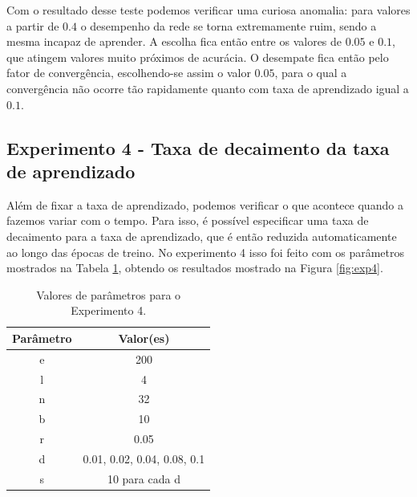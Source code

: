 \documentclass[12pt]{article}
\begin{document}
Com o resultado desse teste podemos verificar uma curiosa anomalia:
para valores a partir de $ 0.4 $ o desempenho da rede se torna 
extremamente ruim, sendo a mesma incapaz de aprender. A escolha fica
então entre os valores de $ 0.05 $ e $ 0.1 $, que atingem valores
muito próximos de acurácia. O desempate fica então pelo fator de
convergência, escolhendo-se assim o valor $ 0.05 $, para o qual a
convergência não ocorre tão rapidamente quanto com taxa de
aprendizado igual a $ 0.1 $.

\subsection{Experimento 4 - Taxa de decaimento da taxa de aprendizado}

Além de fixar a taxa de aprendizado, podemos verificar o que acontece
quando a fazemos variar com o tempo. Para isso, é possível
especificar uma taxa de decaimento para a taxa de aprendizado, que é
então reduzida automaticamente ao longo das épocas de treino.
No experimento 4 isso foi feito com os parâmetros mostrados na Tabela
\ref{tab:exp4}, obtendo os resultados mostrado na Figura 
\ref{fig:exp4}.

\begin{table}[h]
	\centering
	\begin{tabular}{|c|c|}
		\hline
		\textbf{Parâmetro} & \textbf{Valor(es)} \\ \hline
		e & 200 \\ \hline
		l & 4 \\ \hline
		n & 32 \\ \hline
		b & 10 \\ \hline
		r & 0.05 \\ \hline
		d & 0.01, 0.02, 0.04, 0.08, 0.1 \\ \hline
		s & 10 para cada d \\ \hline
	\end{tabular}
	\caption{\label{tab:exp4} Valores de parâmetros para o Experimento
	4.}
\end{table}
\end{document}
